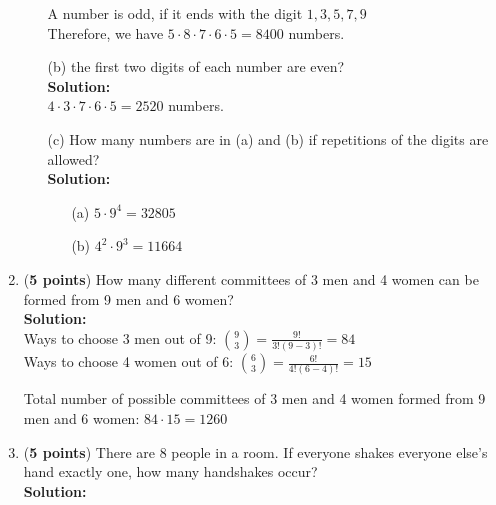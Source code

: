\documentclass[a4paper]{article}
\begin{document}
\begin{enumerate}
\begin{enumerate}
A number is odd, if it ends with the digit $1,3,5,7,9$\\

Therefore, we have $5 \cdot 8 \cdot 7 \cdot 6 \cdot 5 = 8400$ numbers.\\	
	
	
	
	\item[(b)] the first two digits of each number are even?\\
	\textbf{Solution:}\\
	
$4 \cdot 3 \cdot 7 \cdot 6 \cdot 5 = 2520$ numbers.\\	
	
	\newpage
	
	\item[(c)] How many numbers are in (a) and (b) if repetitions of the digits are allowed?\\
	\textbf{Solution:}\\
	
\begin{enumerate}
	\item[(a)] $5 \cdot 9^4 = 32805$
	
	
	\item[(b)] $4^2 \cdot 9^3 = 11664$
\end{enumerate}	
	
	
	
\end{enumerate}


\item (\textbf{5 points}) How many different committees of 3 men and 4 women can be formed from 9 men and 6 women?\\
	\textbf{Solution:}\\

Ways to choose 3 men out of 9: ${9 \choose 3} = \frac{9!}{3!(9-3)!} = 84$\\

Ways to choose 4 women out of 6: ${6 \choose 3} = \frac{6!}{4!(6-4)!} = 15$
	
Total number of possible committees of 3 men and 4 women formed from 9 men and 6 women: $84 \cdot 15 = 1260$\\	
	
	
	
\item (\textbf{5 points}) There are 8 people in a room. If everyone shakes everyone else's hand exactly one, how many handshakes occur?\\
\textbf{Solution:}


\end{enumerate}
\end{document}

